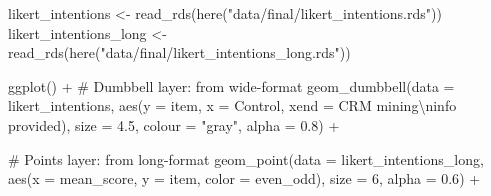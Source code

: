 \documentclass[
  letterpaper,
  DIV=11,
  numbers=noendperiod]{scrartcl}
\newenvironment{Shaded}{\begin{snugshade}}{\end{snugshade}}
\newcommand{\AttributeTok}[1]{\textcolor[rgb]{0.40,0.45,0.13}{#1}}
\newcommand{\CommentTok}[1]{\textcolor[rgb]{0.37,0.37,0.37}{#1}}
\newcommand{\DecValTok}[1]{\textcolor[rgb]{0.68,0.00,0.00}{#1}}
\newcommand{\FloatTok}[1]{\textcolor[rgb]{0.68,0.00,0.00}{#1}}
\newcommand{\FunctionTok}[1]{\textcolor[rgb]{0.28,0.35,0.67}{#1}}
\newcommand{\NormalTok}[1]{\textcolor[rgb]{0.00,0.23,0.31}{#1}}
\newcommand{\OtherTok}[1]{\textcolor[rgb]{0.00,0.23,0.31}{#1}}
\newcommand{\SpecialCharTok}[1]{\textcolor[rgb]{0.37,0.37,0.37}{#1}}
\newcommand{\StringTok}[1]{\textcolor[rgb]{0.13,0.47,0.30}{#1}}
\begin{document}
\begin{Shaded}
\begin{Highlighting}[]
\NormalTok{likert\_intentions }\OtherTok{\textless{}{-}} \FunctionTok{read\_rds}\NormalTok{(}\FunctionTok{here}\NormalTok{(}\StringTok{"data/final/likert\_intentions.rds"}\NormalTok{))}
\NormalTok{likert\_intentions\_long }\OtherTok{\textless{}{-}} \FunctionTok{read\_rds}\NormalTok{(}\FunctionTok{here}\NormalTok{(}\StringTok{"data/final/likert\_intentions\_long.rds"}\NormalTok{))}

\FunctionTok{ggplot}\NormalTok{() }\SpecialCharTok{+}
  \CommentTok{\# Dumbbell layer: from wide{-}format}
  \FunctionTok{geom\_dumbbell}\NormalTok{(}\AttributeTok{data =}\NormalTok{ likert\_intentions,}
                \FunctionTok{aes}\NormalTok{(}\AttributeTok{y =}\NormalTok{ item, }\AttributeTok{x =}\NormalTok{ Control, }\AttributeTok{xend =} \StringTok{\textasciigrave{}}\AttributeTok{CRM mining}\SpecialCharTok{\textbackslash{}n}\AttributeTok{info provided}\StringTok{\textasciigrave{}}\NormalTok{),}
                \AttributeTok{size =} \FloatTok{4.5}\NormalTok{,}
                \AttributeTok{colour =} \StringTok{"gray"}\NormalTok{,}
                \AttributeTok{alpha =} \FloatTok{0.8}\NormalTok{) }\SpecialCharTok{+}
  
  \CommentTok{\# Points layer: from long{-}format}
  \FunctionTok{geom\_point}\NormalTok{(}\AttributeTok{data =}\NormalTok{ likert\_intentions\_long,}
             \FunctionTok{aes}\NormalTok{(}\AttributeTok{x =}\NormalTok{ mean\_score, }\AttributeTok{y =}\NormalTok{ item, }\AttributeTok{color =}\NormalTok{ even\_odd),}
             \AttributeTok{size =} \DecValTok{6}\NormalTok{,}
             \AttributeTok{alpha =} \FloatTok{0.6}\NormalTok{) }\SpecialCharTok{+}
  

\end{Highlighting}
\end{Shaded}
\end{document}
